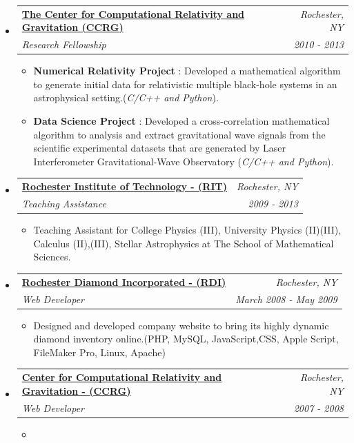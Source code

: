 \documentclass[11pt]{article}
\makeatletter
\newcommand{\resitem}[1]{\item #1 \vspace{-2pt}}
\newcommand{\ressubheading}[4]{
\begin{tabular*}{6.5in}{l@{\extracolsep{\fill}}r}
		\textbf{#1} & \textit{#2} \\
		\textit{#3} & \textit{#4} \\
\end{tabular*}\vspace{-6pt}}
\makeatother
\begin{document}
\begin{itemize}
{\begin{itemize}
{				}
				\end{itemize}
				}
		\item
			\ressubheading{\href{http://ccrg.rit.edu/}{The Center for Computational Relativity and Gravitation (CCRG)}}{Rochester, NY}{Research Fellowship}{2010 - 2013}
				{ \footnotesize
				\begin{itemize}
					\resitem{\textbf{Numerical Relativity Project} : Developed a mathematical algorithm to generate initial data for relativistic multiple black-hole systems in an astrophysical setting.(\textit{C/C++ and Python}).
}
					\resitem{\textbf{Data Science Project} : Developed a cross-correlation mathematical algorithm to analysis and extract gravitational wave signals from the scientific experimental datasets that are generated by Laser Interferometer Gravitational-Wave Observatory (\textit{C/C++ and Python}).
}
				\end{itemize}
          			}
		\item 
			\ressubheading{\href{http://www.rit.edu/}{Rochester Institute of Technology - (RIT)}}{Rochester, NY}{Teaching Assistance}{2009 - 2013}
				{ \footnotesize
				\begin{itemize}
					\resitem{Teaching Assistant for College Physics (III), University Physics (II)(III), Calculus (II),(III), Stellar Astrophysics at The School of Mathematical Sciences.}
				\end{itemize}
				}

		\item	
			\ressubheading{\href{http://rdidiamonds.com/}{Rochester Diamond Incorporated - (RDI)}}{Rochester, NY}{Web Developer}{March 2008 - May 2009}
				{ \footnotesize				
				\begin{itemize}
					\item {Designed and developed company website to bring its highly dynamic diamond inventory online.(PHP, MySQL, JavaScript,CSS, Apple Script, FileMaker Pro, Linux, Apache)}
				\end{itemize}
				}

		\item	
			\ressubheading{\href{http://ccrg.rit.edu/}{Center for Computational Relativity and Gravitation - (CCRG)}}{Rochester, NY}{Web Developer}{2007 - 2008}
				{ \footnotesize				
				\begin{itemize}
					\item {
					
}
\end{itemize}}
\end{itemize}
\end{document}
